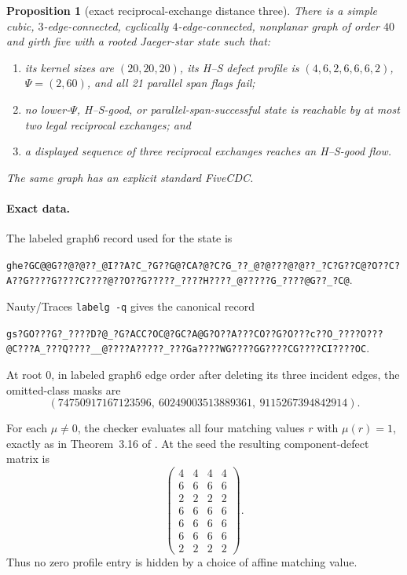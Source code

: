 \documentclass[11pt]{article}
\newtheorem{proposition}[theorem]{Proposition}
\theoremstyle{definition}
\theoremstyle{remark}
\numberwithin{equation}{section}
\begin{document}
\begin{proposition}[exact reciprocal-exchange distance three]
\label{prop:jaeger-three}
There is a simple cubic, \(3\)-edge-connected, cyclically
\(4\)-edge-connected, nonplanar graph of order \(40\) and girth five
with a rooted Jaeger-star state such that:
\begin{enumerate}
\item its kernel sizes are \((20,20,20)\), its H--S defect profile is
      \((4,6,2,6,6,6,2)\), \(\Psi=(2,60)\), and all 21 parallel span
      flags fail;
\item no lower-\(\Psi\), H--S-good, or parallel-span-successful state is
      reachable by at most two legal reciprocal exchanges; and
\item a displayed sequence of three reciprocal exchanges reaches an
      H--S-good flow.
\end{enumerate}
The same graph has an explicit standard FiveCDC.
\end{proposition}

\paragraph{Exact data.}
The labeled graph6 record used for the state is
\begin{center}
\scriptsize
\nolinkurl{ghe?GC@@G??@?@??_@I??A?C_?G??G@?CA?@?C?G_??_@?@???@?@??_?C?G??C@?O??C?A??G????G????C????@??O??G?????_????H????_@?????G_????@G??_?C@}.
\end{center}
Nauty/Traces \texttt{labelg -q} gives the canonical record
\begin{center}
\scriptsize
\nolinkurl{gs?GO???G?_????D?@_?G?ACC?OC@?GC?A@G?O??A???CO??G?O???c??O_????O???@C???A_???Q????__@????A?????_???Ga????WG????GG????CG????CI????OC}.
\end{center}
At root \(0\), in labeled graph6 edge order after deleting its three
incident edges, the omitted-class masks are
\[
 (74750917167123596,\ 60249003513889361,\ 9115267394842914).
\]

For each \(\mu\ne0\), the checker evaluates all four matching values
\(r\) with \(\mu(r)=1\), exactly as in Theorem~3.16 of
\cite{HusekSamal2026}.  At the seed the resulting component-defect
matrix is
\[
\begin{pmatrix}
4&4&4&4\\
6&6&6&6\\
2&2&2&2\\
6&6&6&6\\
6&6&6&6\\
6&6&6&6\\
2&2&2&2
\end{pmatrix}.
\]
Thus no zero profile entry is hidden by a choice of affine matching
value.
\end{document}

